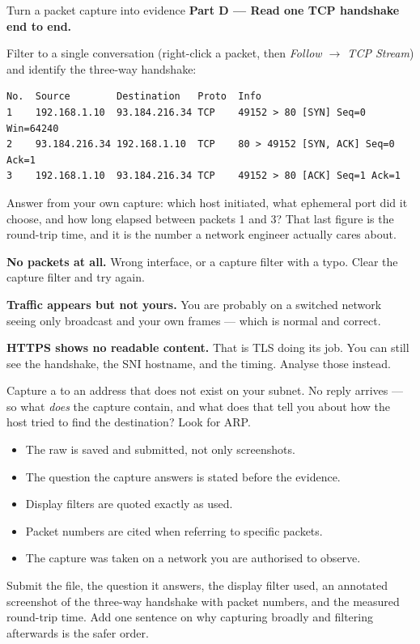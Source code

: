\begin{labproject}{Turn a packet capture into evidence}
\medskip\noindent\textbf{Part D --- Read one TCP handshake end to end.}\par
Filter to a single conversation (right-click a packet, then \emph{Follow $\rightarrow$ TCP Stream}) and identify the three-way handshake:

\begin{lstlisting}[style=dcnterminal]
No.  Source        Destination   Proto  Info
1    192.168.1.10  93.184.216.34 TCP    49152 > 80 [SYN] Seq=0 Win=64240
2    93.184.216.34 192.168.1.10  TCP    80 > 49152 [SYN, ACK] Seq=0 Ack=1
3    192.168.1.10  93.184.216.34 TCP    49152 > 80 [ACK] Seq=1 Ack=1
\end{lstlisting}

Answer from your own capture: which host initiated, what ephemeral port did it choose, and how long elapsed between packets 1 and 3? That last figure is the round-trip time, and it is the number a network engineer actually cares about.

\begin{troubleshoot}
\textbf{No packets at all.} Wrong interface, or a capture filter with a typo. Clear the capture filter and try again.

\textbf{Traffic appears but not yours.} You are probably on a switched network seeing only broadcast and your own frames --- which is normal and correct.

\textbf{HTTPS shows no readable content.} That is TLS doing its job. You can still see the handshake, the SNI hostname, and the timing. Analyse those instead.
\end{troubleshoot}

\begin{tryit}
Capture a  to an address that does not exist on your subnet. No reply arrives --- so what \emph{does} the capture contain, and what does that tell you about how the host tried to find the destination? Look for ARP.
\end{tryit}
\end{labproject}

\begin{verification}
\begin{itemize}
  \item The raw  is saved and submitted, not only screenshots.
  \item The question the capture answers is stated before the evidence.
  \item Display filters are quoted exactly as used.
  \item Packet numbers are cited when referring to specific packets.
  \item The capture was taken on a network you are authorised to observe.
\end{itemize}
\end{verification}

\begin{labdeliverable}
Submit the  file, the question it answers, the display filter used, an annotated screenshot of the three-way handshake with packet numbers, and the measured round-trip time. Add one sentence on why capturing broadly and filtering afterwards is the safer order.
\end{labdeliverable}
